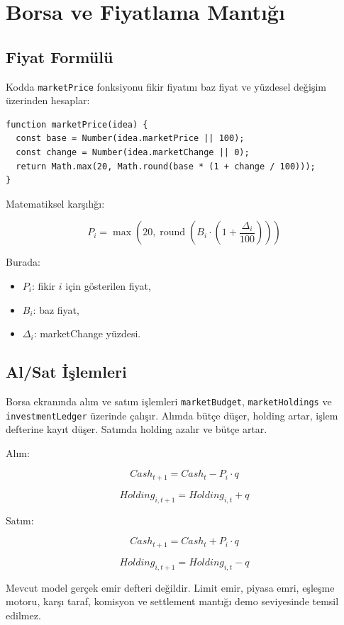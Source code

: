 \documentclass[11pt,a4paper]{article}
\newcommand{\code}[1]{\texttt{#1}}
\begin{document}
\section{Borsa ve Fiyatlama Mantığı}

\subsection{Fiyat Formülü}

Kodda \code{marketPrice} fonksiyonu fikir fiyatını baz fiyat ve yüzdesel değişim üzerinden hesaplar:

\begin{lstlisting}
function marketPrice(idea) {
  const base = Number(idea.marketPrice || 100);
  const change = Number(idea.marketChange || 0);
  return Math.max(20, Math.round(base * (1 + change / 100)));
}
\end{lstlisting}

Matematiksel karşılığı:

\[
P_i = \max(20, \operatorname{round}(B_i \cdot (1 + \frac{\Delta_i}{100})))
\]

Burada:

\begin{itemize}
  \item \(P_i\): fikir \(i\) için gösterilen fiyat,
  \item \(B_i\): baz fiyat,
  \item \(\Delta_i\): marketChange yüzdesi.
\end{itemize}

\subsection{Al/Sat İşlemleri}

Borsa ekranında alım ve satım işlemleri \code{marketBudget}, \code{marketHoldings} ve \code{investmentLedger} üzerinde çalışır. Alımda bütçe düşer, holding artar, işlem defterine kayıt düşer. Satımda holding azalır ve bütçe artar.

Alım:

\[
Cash_{t+1} = Cash_t - P_i \cdot q
\]

\[
Holding_{i,t+1} = Holding_{i,t} + q
\]

Satım:

\[
Cash_{t+1} = Cash_t + P_i \cdot q
\]

\[
Holding_{i,t+1} = Holding_{i,t} - q
\]

Mevcut model gerçek emir defteri değildir. Limit emir, piyasa emri, eşleşme motoru, karşı taraf, komisyon ve settlement mantığı demo seviyesinde temsil edilmez.
\end{document}
